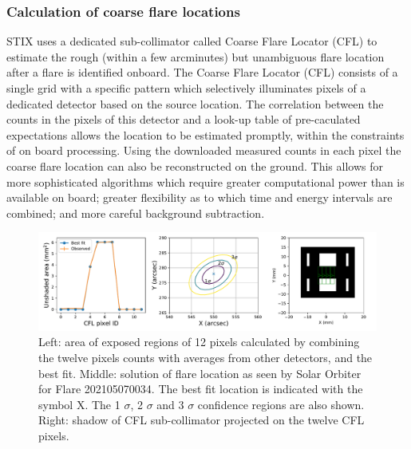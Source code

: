 \documentclass[referee]{aa} %
\begin{document}
\subsubsection{Calculation of coarse flare locations}
STIX uses a dedicated sub-collimator called Coarse Flare Locator (CFL) to estimate 
the rough (within a few arcminutes) but unambiguous flare location after 
a flare is identified onboard.
  The Coarse Flare Locator (CFL) consists of a single grid with
   a specific pattern which selectively illuminates pixels of a 
   dedicated detector based on the source location.
    The correlation between the counts in the pixels of this detector and a look-up table 
    of pre-caculated expectations allows the location to be estimated promptly, 
    within the constraints of on board processing. 
    Using the downloaded measured counts 
    in each pixel the coarse flare location can also be reconstructed on the ground. 
    This allows for more sophisticated algorithms which require greater computational 
    power than is available on board; greater flexibility as to which time and energy 
    intervals are combined; and more careful background subtraction.
\begin{figure}
  \centering
  \includegraphics[width=0.95\linewidth]{figures/cflMay07.pdf}
  \caption{Left: area of exposed regions of 12 pixels calculated by combining
  the twelve pixels counts with averages from other detectors, and the best fit.
   Middle: solution of flare location as seen by Solar Orbiter for Flare 202105070034.
   The best fit location is indicated with the symbol X. The 1 $\sigma$, 2 $\sigma$ and 3 $\sigma$ confidence
   regions are also shown. Right: shadow of CFL sub-collimator projected on the twelve CFL pixels.}
  \label{fig:cflpattern}
\end{figure}
\end{document}
